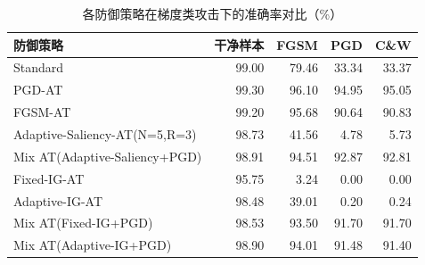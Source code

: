 \begin{table}[htbp]
  \centering
  \caption{各防御策略在梯度类攻击下的准确率对比（\%）}
  \label{tab:result_grad}
  \begin{tabular}{lrrrr}
    \toprule
    \textbf{防御策略} & \textbf{干净样本} & \textbf{FGSM} & \textbf{PGD} & \textbf{C\&W} \\
    \midrule
    Standard                       & 99.00 & 79.46 & 33.34 & 33.37 \\
    PGD-AT                         & 99.30 & 96.10 & 94.95 & 95.05 \\
    FGSM-AT                        & 99.20 & 95.68 & 90.64 & 90.83 \\
    Adaptive-Saliency-AT(N=5,R=3)  & 98.73 & 41.56 &  4.78 &  5.73 \\
    Mix AT(Adaptive-Saliency+PGD)               & 98.91 & 94.51 & 92.87 & 92.81 \\
    \midrule
    Fixed-IG-AT          & 95.75 &  3.24 &  0.00 &  0.00 \\
    Adaptive-IG-AT       & 98.48 & 39.01 &  0.20 &  0.24 \\
    Mix AT(Fixed-IG+PGD)           & 98.53 & 93.50 & 91.70 & 91.70 \\
    Mix AT(Adaptive-IG+PGD)             & 98.90 & 94.01 & 91.48 & 91.40 \\
    \bottomrule
  \end{tabular}
\end{table}

\begin{table}[htbp]
  \centering
  \caption{各防御策略在遮蔽类攻击下的准确率对比（\%）}
  \label{tab:result_occ}
\end{table}

